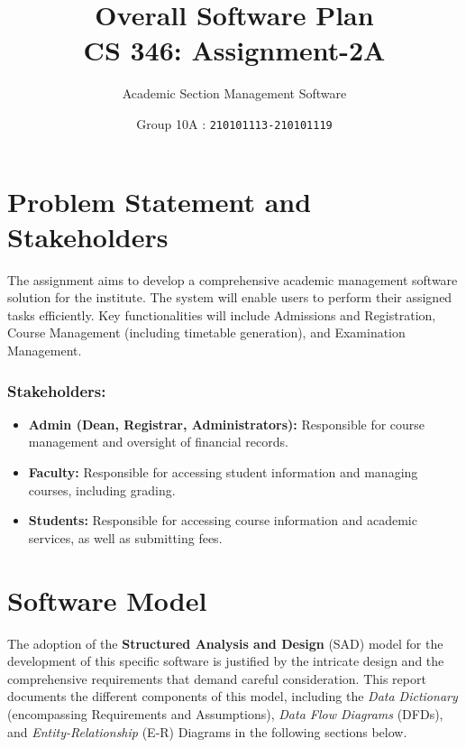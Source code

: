 \documentclass[12pt,a4paper]{article}
\begin{document}
\title{\huge \textbf{Overall Software Plan} \\ \LARGE {\textbf{CS 346: Assignment-2A}}}
\author{\Large Academic Section Management Software}
\date{Group 10A : \texttt{210101113-210101119}}
\maketitle


\section{Problem Statement and Stakeholders}
The assignment aims to develop a comprehensive academic management software solution for the institute. The system will enable users to perform their assigned tasks efficiently. Key functionalities will include Admissions and Registration, Course Management (including timetable generation), and Examination Management.

\subsubsection*{Stakeholders:}
\begin{itemize}
    \item \textbf{Admin (Dean, Registrar, Administrators):} Responsible for course management and oversight of financial records.
    \item \textbf{Faculty:} Responsible for accessing student information and managing courses, including grading.
    \item \textbf{Students:} Responsible for accessing course information and academic services, as well as submitting fees.
\end{itemize}

\section{Software Model}
The adoption of the \textbf{Structured Analysis and Design} (SAD) model for the development of this specific software is justified by the intricate design and the comprehensive requirements that demand careful consideration. This report documents the different components of this model, including the \textit{Data Dictionary} (encompassing Requirements and Assumptions), \textit{Data Flow Diagrams} (DFDs), and \textit{Entity-Relationship} (E-R) Diagrams in the following sections below.
    
\end{document}
